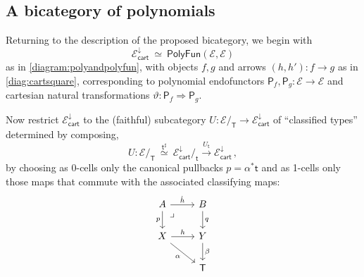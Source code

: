 \documentclass[12pt,reqno]{amsart}
\newcommand{\EE}{\ensuremath{\mathcal{E}}}
\newcommand{\alg}[1]{\ensuremath{\mathsf{#1}}}
\newcommand{\hook}{\ensuremath{\hookrightarrow}}
\renewcommand{\to}{\ensuremath{\rightarrow}}
\newcommand{\too}{\ensuremath{\longrightarrow}}
\renewcommand{\t}{\ensuremath{\mathsf{t}}}
\newcommand{\T}{\ensuremath{\mathsf{T}}}
\newcommand{\TT}{\ensuremath{\dot{\mathsf{T}}}}
\newcommand{\pbcorner}{\arrow[dr,phantom,"\lrcorner" very near start, shift right=.5ex]} %
\newtheorem{proposition}[theorem]{Proposition}
\theoremstyle{remark}
\theoremstyle{definition}
\begin{document}
\subsection{A bicategory of polynomials}\label{sec:2cells}

Returning to the description of the proposed bicategory, we begin with
\[
\EE^{\downarrow}_{\mathsf{cart}}\ \simeq\ \mathsf{PolyFun}(\EE, \EE)
\]
as in \eqref{diagram:polyandpolyfun}, with objects $f, g$ and arrows $(h, h') : f \to g$ as in \eqref{diag:cartsquare}, corresponding to polynomial endofunctors $\alg{P}_f, \alg{P}_g : \EE \to \EE$ and cartesian natural transformations $\vartheta : \alg{P}_f \Rightarrow \alg{P}_g$.

Now restrict $\EE^{\downarrow}_{\mathsf{cart}}$ to the (faithful) subcategory $U : \EE/_\T \to \EE^{\downarrow}_{\mathsf{cart}}$ of ``classified types'' determined by composing,
\begin{equation}\label{eq:faithfulU}
U : \EE/_\T\ \stackrel{\t^{\sharp}}{\simeq}\ \EE^{\downarrow}_{\mathsf{cart}} /_\t \stackrel{U_\t}{\too} \EE^{\downarrow}_{\mathsf{cart}}\,,
\end{equation}
by choosing as 0-cells only the canonical  pullbacks $p = \alpha^{*}\t$ and as 1-cells only those maps that commute with the associated classifying maps:
\begin{equation}\label{diag:classified1cells}
\begin{tikzcd}
A \ar[d,swap, "p"] \ar[r, "{\dot{h}}"] \pbcorner & B \ar[d, "q"] \\
X \ar[r,swap,swap, "{h}"] \ar[rd,swap, "\alpha"] &  Y \ar[d, "\beta"]\\
& \T
\end{tikzcd}
\end{equation}
%
%
\end{document}
